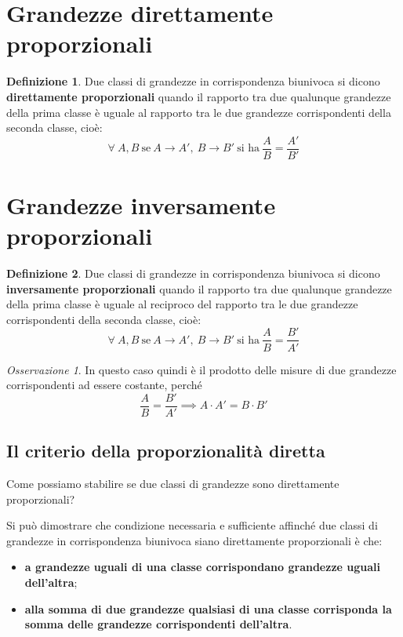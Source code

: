 \documentclass[a4paper,12pt]{article}
\theoremstyle{definition}
\newtheorem{defin}{Definizione}[section]
\theoremstyle{remark}
\newtheorem{oss}{Osservazione}[section]
\begin{document}
\newpage

\section*{Grandezze direttamente proporzionali}

\begin{defin}
Due classi di grandezze in corrispondenza biunivoca si dicono \textbf{direttamente proporzionali} quando il rapporto tra due qualunque grandezze della prima classe è uguale al rapporto tra le due grandezze corrispondenti della seconda classe, cioè:
$$\forall \ A, B \ \text{se} \ A \to A', \ B \to B' \ \text{si ha} \ \frac{A}{B} = \frac{A'}{B'}$$
\end{defin}

\section*{Grandezze inversamente proporzionali}

\begin{defin}
Due classi di grandezze in corrispondenza biunivoca si dicono \textbf{inversamente proporzionali} quando il rapporto tra due qualunque grandezze della prima classe è uguale al reciproco del rapporto tra le due grandezze corrispondenti della seconda classe, cioè:
$$\forall \ A, B \ \text{se} \ A \to A', \ B \to B' \ \text{si ha} \ \frac{A}{B} = \frac{B'}{A'}$$
\end{defin}

\begin{oss}
In questo caso quindi è il prodotto delle misure di due grandezze corrispondenti ad essere costante, perché
$$\frac{A}{B} = \frac{B'}{A'} \implies A \cdot A' = B \cdot B'$$
\end{oss}

\subsection*{Il criterio della proporzionalità diretta}

Come possiamo stabilire se due classi di grandezze sono direttamente proporzionali?

Si può dimostrare che condizione necessaria e sufficiente affinché due classi di grandezze in corrispondenza biunivoca siano direttamente proporzionali è che:
\begin{itemize}
    \item \textbf{a grandezze uguali di una classe corrispondano grandezze uguali dell'altra};
    \item \textbf{alla somma di due grandezze qualsiasi di una classe corrisponda la somma delle grandezze corrispondenti dell'altra}.
\end{itemize}
\end{document}

